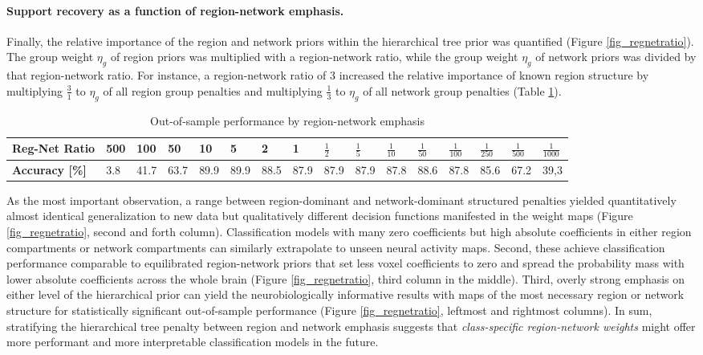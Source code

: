 \documentclass{article}
\begin{document}
\paragraph{Support recovery as a function of region-network emphasis.}
Finally, the relative importance of the
region and network priors within the hierarchical tree prior
was quantified (Figure \ref{fig_regnetratio}).
The group weight $\eta_g$ of region priors was multiplied with a
region-network ratio, while the
group weight $\eta_g$ of network priors was divided by that
region-network ratio. For instance, a region-network ratio of 3
increased the relative importance of known region structure
by multiplying $\frac{3}{1}$ to
$\eta_g$ of all region group penalties
and multiplying
$\frac{1}{3}$ to $\eta_g$ of all network group penalties
(Table \ref{table_reg_net_ratio}).


\begin{table}[]
\centering
\caption{Out-of-sample performance by region-network emphasis}
\begin{tabular}{l|l|l|l|l|l|l|l|l|l|l|l|l|l|l|l}
\textbf{Reg-Net Ratio} & 500 & 100  & 50   & 10   & 5    & 2    & 1    & $\frac{1}{2}$  & $\frac{1}{5}$  & $\frac{1}{10}$ & $\frac{1}{50}$ & $\frac{1}{100}$ & $\frac{1}{250}$ & $\frac{1}{500}$ & $\frac{1}{1000}$ \\ \hline
\textbf{Accuracy {[}\%{]}}      & 3.8          & 41.7 & 63.7 & 89.9 & 89.9 & 88.5 & 87.9 & 87.9 & 87.9 & 87.8 & 88.6 & 87.8  & 85.6  & 67.2  & 39,3  
\end{tabular}
\label{table_reg_net_ratio}
\end{table}

As the most important observation,
a range between region-dominant and network-dominant structured penalties
yielded quantitatively almost identical generalization to new data
but qualitatively different decision functions manifested in the weight maps
(Figure \ref{fig_regnetratio}, second and forth column).
Classification models with many zero coefficients but high absolute
coefficients in either region compartments or network compartments
can similarly extrapolate to unseen neural activity maps.
Second,
these achieve classification performance
comparable to equilibrated region-network priors
that set less voxel coefficients to zero and spread the
probability mass with lower absolute coefficients across the whole brain
(Figure \ref{fig_regnetratio}, third column in the middle).
Third,
overly strong emphasis on either level of the hierarchical prior
can yield the neurobiologically informative results with maps
of the most necessary region or network structure for
statistically significant out-of-sample performance
(Figure \ref{fig_regnetratio}, leftmost and rightmost columns).
%
In sum,
stratifying the hierarchical tree penalty between region and network emphasis
suggests that \textit{class-specific region-network weights}
might offer more performant and more interpretable classification models
in the future.
\end{document}
